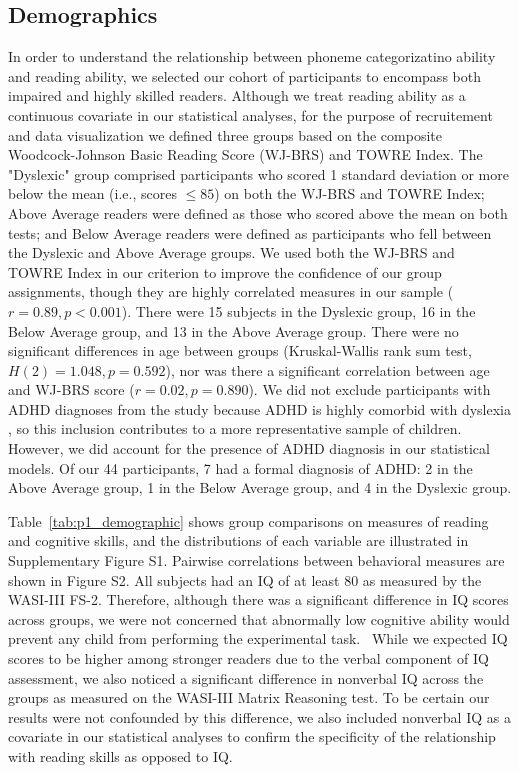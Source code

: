\documentclass[../uwthesis.tex]{subfiles}
\begin{document}
\subsection{Demographics}

In order to understand the relationship between phoneme categorizatino ability and reading ability, we selected our cohort of participants to encompass both impaired and highly skilled readers. Although we treat reading ability as a continuous covariate in our statistical analyses, for the purpose of recruitement and data visualization we defined three groups based on the composite Woodcock-Johnson Basic Reading Score (WJ-BRS) and TOWRE Index. The "Dyslexic" group comprised participants who scored 1 standard deviation or more below the mean (i.e., scores $\leq 85$) on both the WJ-BRS and TOWRE Index; Above Average readers were defined as those who scored above the mean on both tests; and Below Average readers were defined as participants who fell between the Dyslexic and Above Average groups. We used both the WJ-BRS and TOWRE Index in our criterion to improve the confidence of our group assignments, though they are highly correlated measures in our sample ($r=0.89,p<0.001$). There were 15 subjects in the Dyslexic group, 16 in the Below Average group, and 13 in the Above Average group. There were no significant differences in age between groups (Kruskal-Wallis rank sum test, $H(2)=1.048,p=0.592$), nor was there a significant correlation between age and WJ-BRS score ($r=0.02,p=0.890$). We did not exclude participants with ADHD diagnoses from the study because ADHD is highly comorbid with dyslexia \cite{Light1995,Stevenson2005}, so this inclusion contributes to a more representative sample of children. However, we did account for the presence of ADHD diagnosis in our statistical models. Of our 44 participants, 7 had a formal diagnosis of ADHD: 2 in the Above Average group, 1 in the Below Average group, and 4 in the Dyslexic group. 

Table~\ref{tab:p1_demographic} shows group comparisons on measures of reading and cognitive skills, and the distributions of each variable are illustrated in Supplementary Figure S1. Pairwise correlations between behavioral measures are shown in Figure S2. All subjects had an IQ of at least 80 as measured by the WASI-III FS-2. Therefore, although there was a significant difference in IQ scores across groups, we were not concerned that abnormally low cognitive ability would prevent any child from performing the experimental task.  While we expected IQ scores to be higher among stronger readers due to the verbal component of IQ assessment, we also noticed a significant difference in nonverbal IQ across the groups as measured on the WASI-III Matrix Reasoning test. To be certain our results were not confounded by this difference, we also included nonverbal IQ as a covariate in our statistical analyses to confirm the specificity of the relationship with reading skills as opposed to IQ.
\end{document}
